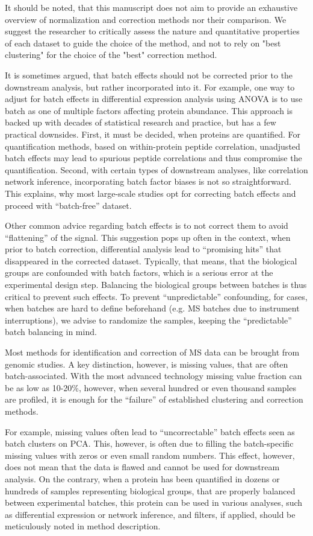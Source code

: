 \documentclass[num-refs]{wiley-article}
\begin{document}
It should be noted, that this manuscript does not aim to provide an exhaustive overview of normalization and correction methods nor their comparison. We suggest the researcher to critically assess the nature and quantitative properties of each dataset to guide the choice of the method, and not to rely on "best clustering" for the choice of the "best" correction method.

It is sometimes argued, that batch effects should not be corrected prior to the downstream analysis, but rather incorporated into it. For example, one way to adjust for batch effects in differential expression analysis using ANOVA is to use batch as one of multiple factors affecting protein abundance. This approach is backed up with decades of statistical research and practice, but has a few practical downsides. First, it must be decided, when proteins are quantified. For quantification methods, based on within-protein peptide correlation, unadjusted batch effects may lead to spurious peptide correlations and thus compromise the quantification. Second, with certain types of downstream analyses, like correlation network inference, incorporating batch factor biases is not so straightforward. This explains, why most large-scale studies opt for correcting batch effects and proceed with “batch-free” dataset.

Other common advice regarding batch effects is to not correct them to avoid “flattening” of the signal. This suggestion pops up often in the context, when prior to batch correction, differential analysis lead to “promising hits” that disappeared in the corrected dataset. Typically, that means, that the biological groups are confounded with batch factors, which is a serious error at the experimental design step. Balancing the biological groups between batches is thus critical to prevent such effects. To prevent “unpredictable” confounding, for cases, when batches are hard to define beforehand (e.g. MS batches due to instrument interruptions), we advise to randomize the samples, keeping the “predictable” batch balancing in mind.

Most methods for identification and correction of MS data can be brought from genomic studies. A key distinction, however, is missing values, that are often batch-associated. With the most advanced technology missing value fraction can be as low as 10-20\%, however, when several hundred or even thousand samples are profiled, it is enough for the “failure” of established clustering and correction methods. 

For example, missing values often lead to “uncorrectable” batch effects seen as batch clusters on PCA. This, however, is often due to filling the batch-specific missing values with zeros or even small random numbers. This effect, however, does not mean that the data is flawed and cannot be used for downstream analysis. On the contrary, when a protein has been quantified in dozens or hundreds of samples representing biological groups, that are properly balanced between experimental batches, this protein can be used in various analyses, such as differential expression or network inference, and filters, if applied, should be meticulously noted in method description.
\end{document}
